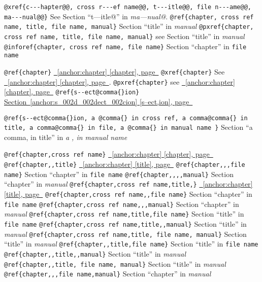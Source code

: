 \documentclass{book}
\begin{document}
\texttt{@xref\{c{-}{-}{-}hapter@@, cross r{-}{-}{-}ef name@@, t{-}{-}{-}itle@@, file n{-}{-}{-}ame@@, ma{-}{-}{-}nual@@\}} See Section ``t---itle@'' in \textsl{ma---nual@}.
\texttt{@ref\{chapter, cross ref name, title, file name, manual\}} Section ``title'' in \textsl{manual}
\texttt{@pxref\{chapter, cross ref name, title, file name, manual\}} see Section ``title'' in \textsl{manual}
\texttt{@inforef\{chapter, cross ref name, file name\}} Section ``chapter'' in \texttt{file name}

\texttt{@ref\{chapter\}} \hyperref[anchor:chapter]{\chaptername~\ref*{anchor:chapter} [chapter], page~\pageref*{anchor:chapter}}
\texttt{@xref\{chapter\}} See \hyperref[anchor:chapter]{\chaptername~\ref*{anchor:chapter} [chapter], page~\pageref*{anchor:chapter}}.
\texttt{@pxref\{chapter\}} see \hyperref[anchor:chapter]{\chaptername~\ref*{anchor:chapter} [chapter], page~\pageref*{anchor:chapter}}
\texttt{@ref\{s{-}{-}ect@comma\{\}ion\}} \hyperref[anchor:s_002d_002dect_002cion]{Section~\ref*{anchor:s_002d_002dect_002cion} [s--ect,ion], page~\pageref*{anchor:s_002d_002dect_002cion}}

\texttt{@ref\{s{-}{-}ect@comma\{\}ion, a @comma\{\} in cross
ref, a comma@comma\{\} in title, a comma@comma\{\} in file, a @comma\{\} in manual name \}}
Section ``a comma, in title'' in \textsl{a , in manual name}

\texttt{@ref\{chapter,cross ref name\}} \hyperref[anchor:chapter]{\chaptername~\ref*{anchor:chapter} [chapter], page~\pageref*{anchor:chapter}}
\texttt{@ref\{chapter,,title\}} \hyperref[anchor:chapter]{\chaptername~\ref*{anchor:chapter} [title], page~\pageref*{anchor:chapter}}
\texttt{@ref\{chapter,,,file name\}} Section ``chapter'' in \texttt{file name}
\texttt{@ref\{chapter,,,,manual\}} Section ``chapter'' in \textsl{manual}
\texttt{@ref\{chapter,cross ref name,title,\}} \hyperref[anchor:chapter]{\chaptername~\ref*{anchor:chapter} [title], page~\pageref*{anchor:chapter}}
\texttt{@ref\{chapter,cross ref name,,file name\}} Section ``chapter'' in \texttt{file name}
\texttt{@ref\{chapter,cross ref name,,,manual\}} Section ``chapter'' in \textsl{manual}
\texttt{@ref\{chapter,cross ref name,title,file name\}} Section ``title'' in \texttt{file name}
\texttt{@ref\{chapter,cross ref name,title,,manual\}} Section ``title'' in \textsl{manual}
\texttt{@ref\{chapter,cross ref name,title, file name, manual\}} Section ``title'' in \textsl{manual}
\texttt{@ref\{chapter,,title,file name\}} Section ``title'' in \texttt{file name}
\texttt{@ref\{chapter,,title,,manual\}} Section ``title'' in \textsl{manual}
\texttt{@ref\{chapter,,title, file name, manual\}} Section ``title'' in \textsl{manual}
\texttt{@ref\{chapter,,,file name,manual\}} Section ``chapter'' in \textsl{manual}
\end{document}
